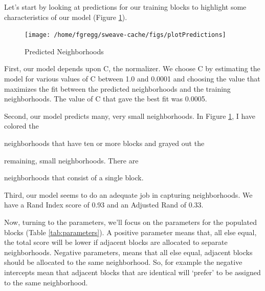 \documentclass[12pt,letter]{article}\usepackage[]{graphicx}\usepackage[]{color}
\newenvironment{knitrout}{}{} %
\begin{document}
Let’s start by looking at predictions for our training blocks to
highlight some characteristics of our model (Figure
\ref{fig:predictTraining}).

\begin{figure}
\begin{knitrout}
\color{fgcolor}

{\centering \texttt{[image: /home/fgregg/sweave-cache/figs/plotPredictions]} 

}



\end{knitrout}

\caption{Predicted Neighborhoods}
\label{fig:predictTraining}
\end{figure}




First, our model depends upon C, the normalizer. We choose C by
estimating the model for various values of C between 1.0 and 0.0001
and choosing the value that maximizes the fit between the predicted
neighborhoods and the training neighborhoods. The value of C that gave
the best fit was 0.0005.

Second, our model predicts many, very small neighborhoods. In Figure
\ref{fig:predictTraining}, I have colored the


{\ttfamily\noindent\bfseries\color{errorcolor}{\\Error in eval(expr, envir, enclos) : object 'hood\_frequency' not found}} neighborhoods that have ten or more
blocks and grayed out the 

{\ttfamily\noindent\bfseries\color{errorcolor}{\\Error in eval(expr, envir, enclos) : object 'hood\_frequency' not found}} remaining,
small neighborhoods. There are 

{\ttfamily\noindent\bfseries\color{errorcolor}{\\Error in eval(expr, envir, enclos) : object 'hood\_frequency' not found}}
neighborhoods that consist of a single block.

Third, our model seems to do an adequate job in capturing
neighborhoods. We have a Rand Index score of 0.93 and an
Adjusted Rand of 0.33.

Now, turning to the parameters, we'll focus on the parameters for the
populated blocks (Table \ref{tab:parameters}). A positive parameter
means that, all else equal, the total score will be lower if adjacent
blocks are allocated to separate neighborhoods. Negative parameters,
means that all else equal, adjacent blocks should be allocated to the
same neighborhood. So, for example the negative intercepts mean that
adjacent blocks that are identical will ‘prefer’ to be assigned to the
same neighborhood.
\end{document}
